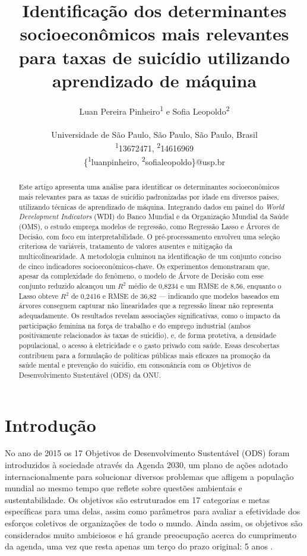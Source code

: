 \documentclass[letterpaper]{article}
\title{Identificação dos determinantes socioeconômicos mais relevantes para taxas de suicídio utilizando aprendizado de máquina}
\author{Luan Pereira Pinheiro\textsuperscript{\rm 1} e Sofia Leopoldo\textsuperscript{\rm 2}\\\\
Universidade de São Paulo, São Paulo, São Paulo, Brasil\\
\textsuperscript{\rm 1}13672471, \textsuperscript{\rm 2}14616969\\
\{\textsuperscript{\rm 1}luanpinheiro, \textsuperscript{\rm 2}sofialeopoldo\}@usp.br\\
}
\begin{document}
\maketitle

\begin{abstract}
Este artigo apresenta uma análise para identificar os determinantes socioeconômicos mais relevantes para as taxas de suicídio padronizadas por idade em diversos países, utilizando técnicas de aprendizado de máquina. Integrando dados em painel do \textit{World Development Indicators} (WDI) do Banco Mundial e da Organização Mundial da Saúde (OMS), o estudo emprega modelos de regressão, como Regressão Lasso e Árvores de Decisão, com foco em interpretabilidade. O pré-processamento envolveu uma seleção criteriosa de variáveis, tratamento de valores ausentes e mitigação da multicolinearidade. A metodologia culminou na identificação de um conjunto conciso de cinco indicadores socioeconômicos-chave. Os experimentos demonstraram que, apesar da complexidade do fenômeno, o modelo de Árvore de Decisão com esse conjunto reduzido alcançou um $R^2$ médio de 0{,}8234 e um RMSE de 8{,}56, enquanto o Lasso obteve $R^2$ de 0{,}2416 e RMSE de 36{,}82 — indicando que modelos baseados em árvores conseguem capturar não linearidades que a regressão linear não representa adequadamente. Os resultados revelam associações significativas, como o impacto da participação feminina na força de trabalho e do emprego industrial (ambos positivamente relacionados às taxas de suicídio), e, de forma protetiva, a densidade populacional, o acesso à eletricidade e o gasto privado com saúde. Essas descobertas contribuem para a formulação de políticas públicas mais eficazes na promoção da saúde mental e prevenção do suicídio, em consonância com os Objetivos de Desenvolvimento Sustentável (ODS) da ONU.
\end{abstract}
\section{Introdução} %

No ano de 2015 os 17 Objetivos de Desenvolvimento Sustentável (ODS) foram introduzidos à sociedade através da Agenda 2030, um plano de ações adotado internacionalmente para solucionar diversos problemas que afligem a população mundial ao mesmo tempo que reflete sobre questões ambientais e sustentabilidade. Os objetivos são estruturados em 17 categorias e metas específicas para uma delas, assim como parâmetros para avaliar a efetividade dos esforços coletivos de organizações de todo o mundo. Ainda assim, os objetivos são considerados muito ambiciosos e há grande preocupação acerca do cumprimento da agenda, uma vez que resta apenas um terço do prazo original: 5 anos \cite{unagenda2030}.
\end{document}
